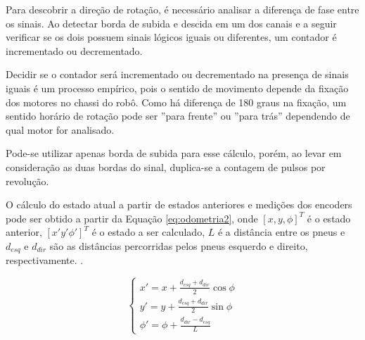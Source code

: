 Para descobrir a direção de rotação, é necessário analisar a diferença 
de fase entre os sinais. Ao detectar borda de subida e descida em 
um dos canais e a seguir verificar se os dois possuem sinais lógicos 
iguais ou diferentes, um contador é incrementado ou decrementado. 

Decidir se o contador será incrementado ou decrementado na presença de
sinais iguais é um processo empírico, pois o sentido de movimento 
depende da fixação dos motores no chassi do robô. Como há diferença 
de 180 graus na fixação, um sentido horário de rotação pode ser ''para 
frente'' ou ''para trás'' dependendo de qual motor for analisado.

Pode-se utilizar apenas borda de subida para esse cálculo, porém, 
ao levar em consideração as duas bordas do sinal, duplica-se
a contagem de pulsos por revolução.

O cálculo do estado atual a partir de estados anteriores e medições
dos encoders pode ser obtido a partir da Equação \ref{eq:odometria2},
onde $[x,y,\phi]^T$ é o estado anterior, $[x' y' \phi']^T$ é o estado
a ser calculado, $L$ é a distância entre os pneus e $d_{esq}$ e 
$d_{dir}$ são as distâncias percorridas pelos pneus esquerdo e direito, 
respectivamente. \cite{art:odometria1}.

\begin{equation}
	\label{eq:odometria2}
	\left \{ \begin{matrix} x' = x + \frac{d_{esq} + d_{dir}}{2} \cos{\phi}
	\\
	y' = y + \frac{d_{esq} + d_{dir}}{2} \sin{\phi}
	\\
	\phi' = \phi + \frac{d_{dir} - d_{esq}}{L} \end{matrix} \right.
\end{equation}



	
